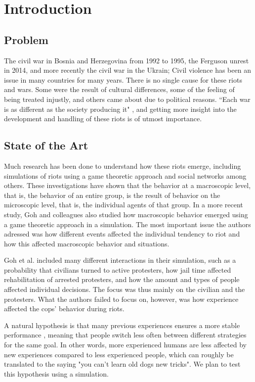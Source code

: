 \section{Introduction}
\subsection{Problem}
The civil war in Bosnia and Herzegovina from 1992 to 1995, the Ferguson unrest in 2014, and more recently the civil war in the Ukrain; Civil violence has been an issue in many countries for many years.
There is no single cause for these riots and wars.
Some were the result of cultural differences, some of the feeling of being treated injustly, and others came about due to political reasons.
``Each war is as different as the society producing it" \citep*{sambanis2001ethnic}, and getting more insight into the development and handling of these riots is of utmost importance.


\subsection{State of the Art}
Much research has been done to understand how these riots emerge, including simulations of riots using a game theoretic approach \citep*{myerson1991game} and social networks \citep*{gulden2002spatial} among others.
These investigations have shown that the behavior at a macroscopic level, that is, the behavior of an entire group, is the result of behavior on the microscopic level, that is, the individual agents of that group.
In a more recent study, Goh and colleagues \citep*{goh2006modeling} also studied how macroscopic behavior emerged using a game theoretic approach in a simulation.
The most important issue the authors adressed was how different events affected the individual tendency to riot and how this affected macroscopic behavior and situations.


Goh et al.
included many different interactions in their simulation, such as a probability that civilians turned to active protesters, how jail time affected rehabilitation of arrested protesters, and how the amount and types of people affected individual decisions.
The focus was thus mainly on the civilian and the protesters.
What the authors failed to focus on, however, was how experience affected the cops' behavior during riots.

A natural hypothesis is that many previous experiences ensures a more stable performance \citep{anderson2007mind,nason2005soar}, 
meaning that people switch less often between different strategies for the same goal.
In other words, more experienced humans are less affected by new experiences compared to less experienced people, which can roughly be translated to the saying "you can't learn old dogs new tricks". 
We plan to test this hypothesis using a simulation.

